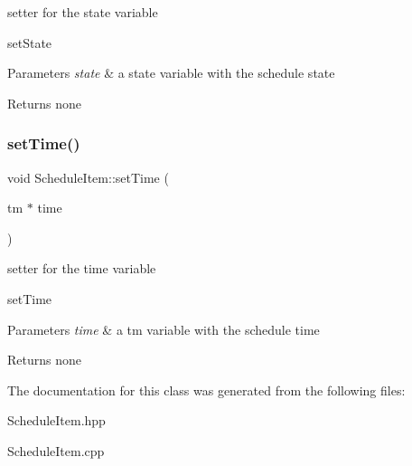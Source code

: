 setter for the state variable 

set\+State 
\begin{DoxyParams}{Parameters}
{\em state} & a state variable with the schedule state \\
\hline
\end{DoxyParams}
\begin{DoxyReturn}{Returns}
none 
\end{DoxyReturn}
\mbox{\label{class_schedule_item_a690b36b91bb76a8568550d9350cad2f5}} 
\subsubsection{\texorpdfstring{set\+Time()}{setTime()}}
{\footnotesize\ttfamily void Schedule\+Item\+::set\+Time (\begin{DoxyParamCaption}\item[{tm $\ast$}]{time }\end{DoxyParamCaption})}



setter for the time variable 

set\+Time 
\begin{DoxyParams}{Parameters}
{\em time} & a tm variable with the schedule time \\
\hline
\end{DoxyParams}
\begin{DoxyReturn}{Returns}
none 
\end{DoxyReturn}


The documentation for this class was generated from the following files\+:\begin{DoxyCompactItemize}
\item 
Schedule\+Item.\+hpp\item 
Schedule\+Item.\+cpp\end{DoxyCompactItemize}
